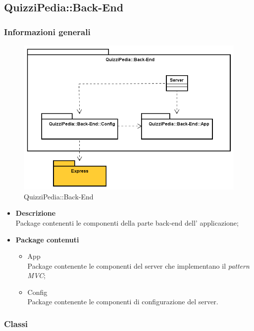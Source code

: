 \subsection{QuizziPedia::Back-End}
\subsubsection{Informazioni generali}
\label{QuizziPedia::Back-End}
\begin{figure}[ht]
	\centering
	\includegraphics[scale=0.45]{UML/Package/QuizziPedia_Back-End.png}
	\caption{QuizziPedia::Back-End}
\end{figure}
\FloatBarrier
	\begin{itemize}
		\item \textbf{Descrizione} \\ Package contenenti le componenti della parte back-end dell' applicazione;
		\item \textbf{Package contenuti}
		\begin{itemize}
			\item App \\
			Package contenente le componenti del server che implementano il \textit{pattern MVC};
			\item Config \\
			Package contenente le componenti di configurazione del server.
		\end{itemize}
	\end{itemize}
\subsubsection{Classi}
